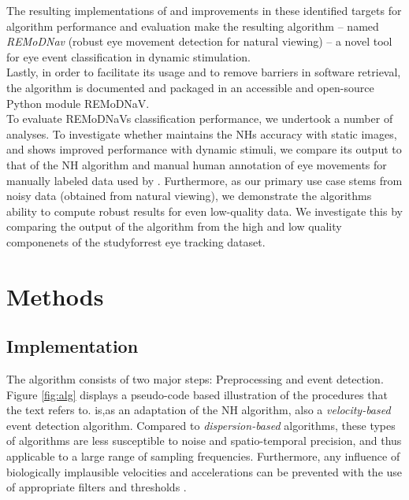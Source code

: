 The resulting implementations of and improvements in these identified targets for algorithm performance and evaluation make the resulting algorithm -- named \textit{REMoDNav} (robust eye movement detection for natural viewing) -- a novel tool for eye event classification in dynamic stimulation.\\
Lastly, in order to facilitate its usage and to remove barriers in software retrieval, the \remodnav algorithm is documented and packaged in an accessible and open-source Python module REMoDNaV. \\

To evaluate REMoDNaVs classification performance, we undertook a number of analyses. To investigate whether \remodnav maintains the NHs accuracy with static images, and shows improved performance with dynamic stimuli, we compare its output to that of the NH algorithm and manual human annotation of eye movements for manually labeled data used by \cite{Andersson2017}. Furthermore, as our primary use case stems from noisy data (obtained from natural viewing), we demonstrate the algorithms ability to compute robust results for even low-quality data. We investigate this by comparing the output of the algorithm from the high and low quality componenets of the studyforrest eye tracking dataset. 




\section*{Methods}\label{methods}


\subsection*{\remodnav Implementation}\label{impl}
 

The algorithm consists of two major steps: Preprocessing and event detection. Figure \ref{fig:alg} displays a pseudo-code based illustration of the procedures that the text refers to. \remodnav is,as an adaptation of the NH algorithm, also a \textit{velocity-based} event detection algorithm. Compared to \textit{dispersion-based} algorithms, these types of algorithms are less susceptible to noise and spatio-temporal precision, and thus applicable to a large range of sampling frequencies. Furthermore, any influence of biologically implausible velocities and accelerations can be prevented with the use of appropriate filters and thresholds \citep{holmqvist2011eye}.

